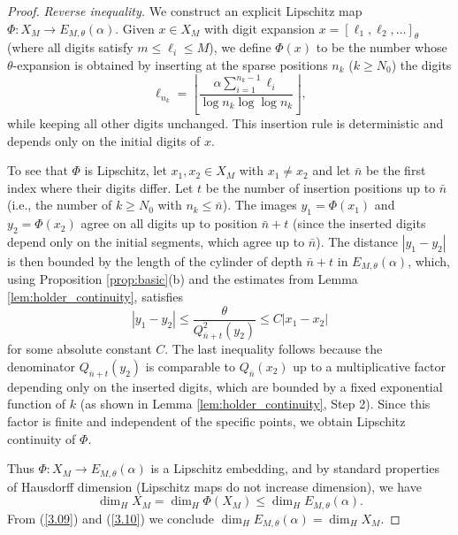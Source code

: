 \documentclass{article}
\numberwithin{equation}{section}
\begin{document}
\begin{proof}
%

\emph{Reverse inequality.}  
We construct an explicit Lipschitz map $\Phi: X_M \to E_{M,\theta}(\alpha)$. Given $x \in X_M$ with digit expansion $x = [\ell_1, \ell_2, \ldots]_\theta$ (where all digits satisfy $m \le \ell_i \le M$), we define $\Phi(x)$ to be the number whose $\theta$-expansion is obtained by inserting at the sparse positions $n_k$ ($k \ge N_0$) the digits
\[
\ell_{n_k} = \left\lfloor \frac{\alpha \sum_{i=1}^{n_k-1} \ell_i}{\log n_k \log \log n_k} \right\rfloor,
\]
while keeping all other digits unchanged. This insertion rule is deterministic and depends only on the initial digits of $x$.

To see that $\Phi$ is Lipschitz, let $x_1, x_2 \in X_M$ with $x_1 \neq x_2$ and let $\bar{n}$ be the first index where their digits differ. Let $t$ be the number of insertion positions up to $\bar{n}$ (i.e., the number of $k \ge N_0$ with $n_k \le \bar{n}$). The images $y_1 = \Phi(x_1)$ and $y_2 = \Phi(x_2)$ agree on all digits up to position $\bar{n}+t$ (since the inserted digits depend only on the initial segments, which agree up to $\bar{n}$). The distance $|y_1-y_2|$ is then bounded by the length of the cylinder of depth $\bar{n}+t$ in $E_{M,\theta}(\alpha)$, which, using Proposition \ref{prop:basic}(b) and the estimates from Lemma \ref{lem:holder_continuity}, satisfies
\[
|y_1-y_2| \le \frac{\theta}{Q_{\bar{n}+t}^2(y_2)} \le C |x_1-x_2|
\]
for some absolute constant $C$. The last inequality follows because the denominator $Q_{\bar{n}+t}(y_2)$ is comparable to $Q_{\bar{n}}(x_2)$ up to a multiplicative factor depending only on the inserted digits, which are bounded by a fixed exponential function of $k$ (as shown in Lemma \ref{lem:holder_continuity}, Step 2). Since this factor is finite and independent of the specific points, we obtain Lipschitz continuity of $\Phi$.
 

Thus $\Phi: X_M \to E_{M,\theta}(\alpha)$ is a Lipschitz embedding, and by standard properties of Hausdorff dimension (Lipschitz maps do not increase dimension), we have
\begin{equation}
\dim_H X_M = \dim_H \Phi(X_M) \le \dim_H E_{M,\theta}(\alpha). \label{3.10}
\end{equation}
%
From (\ref{3.09}) and (\ref{3.10}) we conclude $\dim_H E_{M,\theta}(\alpha) = \dim_H X_M$.

\end{proof}
\end{document}
